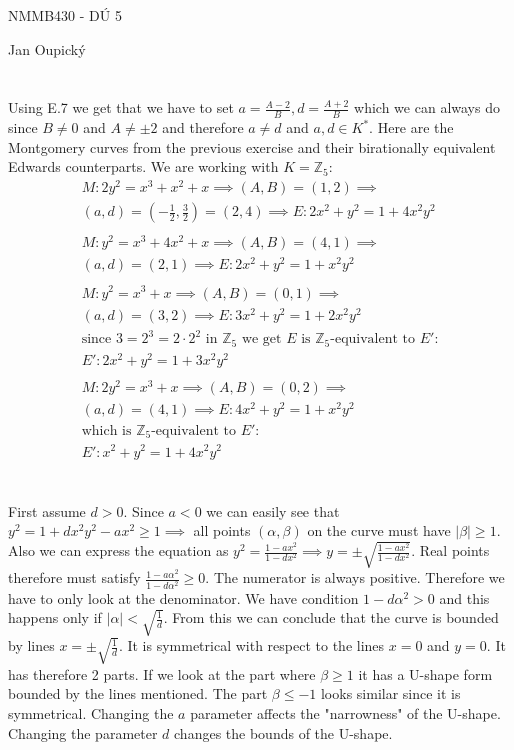 \documentclass[12pt, a4paper]{article}
\begin{document}
\begin{center}
\large NMMB430 - DÚ 5

\normalsize Jan Oupický
\end{center}
\vspace{1\baselineskip}

\section{}
Using E.7 we get that we have to set $a = \frac{A-2}{B}, d = \frac{A+2}{B}$ which we can always do since $B \neq 0$ and $A\neq \pm2$ and therefore $a \neq d$ and $a, d \in K^*$. Here are the Montgomery curves from the previous exercise and their birationally equivalent Edwards counterparts. We are working with $K = \mathbb{Z}_5$:
\begin{gather*}
M: 2y^2=x^3+x^2+x \implies (A,B) = (1,2) \implies\\
(a,d) = \left(-\frac{1}{2}, \frac{3}{2}\right) = (2,4) \implies E: 2x^2+y^2=1+4x^2y^2 \\\\
M: y^2=x^3+4x^2+x \implies (A,B) = (4, 1) \implies\\
(a,d) = (2, 1) \implies E: 2x^2+y^2=1+x^2y^2\\\\
M: y^2=x^3+x \implies (A,B) = (0, 1) \implies\\
(a, d) = (3, 2) \implies E: 3x^2+y^2=1+2x^2y^2\\
\text{since $3 = 2^3 = 2\cdot2^2$ in $\mathbb{Z}_5$ we get $E$ is $\mathbb{Z}_5$-equivalent to $E'$:}\\
E': 2x^2+y^2=1+3x^2y^2\\\\
M: 2y^2=x^3+x \implies (A,B) = (0,2) \implies\\
(a, d) = (4,1) \implies E: 4x^2+y^2=1+x^2y^2\\
\text{which is $\mathbb{Z}_5$-equivalent to $E'$:}\\
E': x^2+y^2=1+4x^2y^2
\end{gather*}

\section{}
First assume $d > 0$. Since $a < 0$ we can easily see that $y^2 = 1+dx^2y^2-ax^2 \geq 1 \implies$ all points $(\alpha, \beta)$ on the curve must have $|\beta| \geq 1$. Also we can express the equation as $y^2=\frac{1-ax^2}{1-dx^2} \implies y = \pm \sqrt{\frac{1-ax^2}{1-dx^2}}$. Real points therefore must satisfy $\frac{1-a\alpha^2}{1-d\alpha^2} \geq 0$. The numerator is always positive. Therefore we have to only look at the denominator. We have condition $1-d\alpha^2 > 0$ and this happens only if $|\alpha| < \sqrt{\frac{1}{d}}$. From this we can conclude that the curve is bounded by lines $x=\pm \sqrt{\frac{1}{d}}$. It is symmetrical with respect to the lines $x=0$ and $y=0$. It has therefore 2 parts. If we look at the part where $\beta \geq 1$ it has a U-shape form bounded by the lines mentioned. The part $\beta \leq -1$ looks similar since it is symmetrical. Changing the $a$ parameter affects the "narrowness" of the U-shape. Changing the parameter $d$ changes the bounds of the U-shape.
\end{document}

